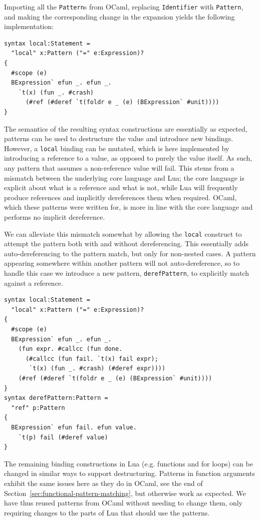 \documentclass{kththesis}
\begin{document}
Importing all the \texttt{Pattern}s from OCaml, replacing \texttt{Identifier} with \texttt{Pattern}, and making the corresponding change in the expansion yields the following implementation:

\begin{verbatim}
syntax local:Statement =
  "local" x:Pattern ("=" e:Expression)?
{
  #scope (e)
  BExpression` efun _. efun _.
    `t(x) (fun _. #crash)
      (#ref (#deref `t(foldr e _ (e) (BExpression` #unit))))
}
\end{verbatim}

The semantics of the resulting syntax constructions are essentially as expected, patterns can be used to destructure the value and introduce new bindings. However, a \texttt{local} binding can be mutated, which is here implemented by introducing a reference to a value, as opposed to purely the value itself. As such, any pattern that assumes a non-reference value will fail. This stems from a mismatch between the underlying core language and Lua; the core language is explicit about what is a reference and what is not, while Lua will frequently produce references and implicitly dereferences them when required. OCaml, which these patterns were written for, is more in line with the core language and performs no implicit dereference.

We can alleviate this mismatch somewhat by allowing the \texttt{local} construct to attempt the pattern both with and without dereferencing. This essentially adds auto-dereferencing to the pattern match, but only for non-nested cases. A pattern appearing somewhere within another pattern will not auto-dereference, so to handle this case we introduce a new pattern, \texttt{derefPattern}, to explicitly match against a reference.

\begin{verbatim}
syntax local:Statement =
  "local" x:Pattern ("=" e:Expression)?
{
  #scope (e)
  BExpression` efun _. efun _.
    (fun expr. #callcc (fun done.
      (#callcc (fun fail. `t(x) fail expr);
       `t(x) (fun _. #crash) (#deref expr))))
    (#ref (#deref `t(foldr e _ (e) (BExpression` #unit))))
}
syntax derefPattern:Pattern =
  "ref" p:Pattern
{
  BExpression` efun fail. efun value.
    `t(p) fail (#deref value)
}
\end{verbatim}

The remaining binding constructions in Lua (e.g. functions and for loops) can be changed in similar ways to support destructuring. Patterns in function arguments exhibit the same issues here as they do in OCaml, see the end of Section~\ref{sec:functional-pattern-matching}, but otherwise work as expected. We have thus reused patterns from OCaml without needing to change them, only requiring changes to the parts of Lua that should use the patterns.
\end{document}
